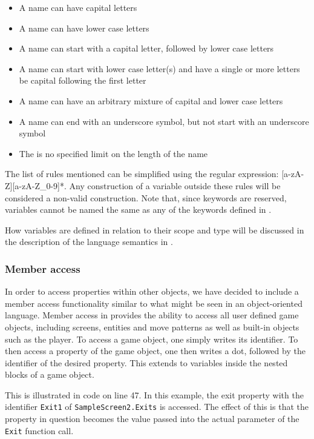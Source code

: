 \begin{itemize}
    \item A name can have capital letters
    \item A name can have lower case letters
    \item A name can start with a capital letter, followed by lower case letters
    \item A name can start with lower case letter(s) and have a single or more letters be capital following the first letter
    \item A name can have an arbitrary mixture of capital and lower case letters
    \item A name can end with an underscore symbol, but not start with an underscore symbol
    \item The is no specified limit on the length of the name
\end{itemize}

The list of rules mentioned can be simplified using the regular expression: [a-zA-Z][a-zA-Z\_0-9]*. Any construction of a variable outside these rules will be considered
a non-valid construction. Note that, since keywords are reserved, variables cannot be named the same as any of the keywords defined in .

How variables are defined in relation to their scope and type will be discussed in the description of the language semantics in .

\subsubsection*{Member access}
In order to access properties within other objects, we have decided to include a member access functionality similar to what might be seen in an
object-oriented language. Member access in \dazel{} provides the ability to access all user defined game objects, including screens, entities and move patterns as well
as built-in objects such as the player. To access a game object, one simply writes its identifier. To then access a property of the game object, one then writes
a dot, followed by the identifier of the desired property. This extends to variables inside the nested blocks of a game object.

This is illustrated in code  on line 47. In this example, the exit property with the identifier \texttt{Exit1} of \texttt{SampleScreen2.Exits} is accessed.
The effect of this is that the property in question becomes the value passed into the actual parameter of the \texttt{Exit} function call.

